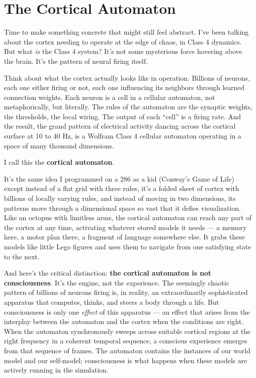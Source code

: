 \documentclass[11pt, twoside, openright]{book}
\begin{document}
\section*{The Cortical Automaton}

Time to make something concrete that might still feel abstract. I've been talking about the cortex needing to operate at the edge of chaos, in Class 4 dynamics. But what \textit{is} the Class 4 system? It's not some mysterious force hovering above the brain. It's the pattern of neural firing itself.

Think about what the cortex actually looks like in operation. Billions of neurons, each one either firing or not, each one influencing its neighbors through learned connection weights. Each neuron is a cell in a cellular automaton, not metaphorically, but literally. The rules of the automaton are the synaptic weights, the thresholds, the local wiring. The output of each ``cell'' is a firing rate. And the result, the grand pattern of electrical activity dancing across the cortical surface at 10 to 40 Hz, is a Wolfram Class 4 cellular automaton operating in a space of many thousand dimensions.

I call this the \textbf{cortical automaton}.

It's the same idea I programmed on a 286 as a kid (Conway's Game of Life) except instead of a flat grid with three rules, it's a folded sheet of cortex with billions of locally varying rules, and instead of moving in two dimensions, its patterns move through a dimensional space so vast that it defies visualization. Like an octopus with limitless arms, the cortical automaton can reach any part of the cortex at any time, activating whatever stored models it needs --- a memory here, a motor plan there, a fragment of language somewhere else. It grabs these models like little Lego figures and uses them to navigate from one satisfying state to the next.

And here's the critical distinction: \textbf{the cortical automaton is not consciousness}. It's the engine, not the experience. The seemingly chaotic pattern of billions of neurons firing is, in reality, an extraordinarily sophisticated apparatus that computes, thinks, and steers a body through a life. But consciousness is only one \textit{effect} of this apparatus --- an effect that arises from the interplay between the automaton and the cortex when the conditions are right. When the automaton synchronously sweeps across suitable cortical regions at the right frequency in a coherent temporal sequence, a conscious experience emerges from that sequence of frames. The automaton contains the instances of our world model and our self-model; consciousness is what happens when these models are actively running in the simulation.
\end{document}

